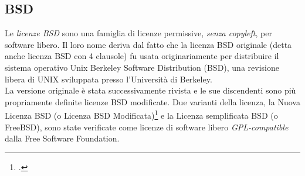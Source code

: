 \subsection{BSD}
Le \textit{licenze BSD} sono una famiglia di licenze permissive, \textit{senza copyleft}, per software libero. Il loro nome deriva dal fatto che la licenza BSD originale (detta anche licenza BSD con 4 clausole) fu usata originariamente per distribuire il sistema operativo Unix Berkeley Software Distribution (BSD), una revisione libera di UNIX sviluppata presso l'Università di Berkeley. \\
La versione originale è stata successivamente rivista e le sue discendenti sono più propriamente definite licenze BSD modificate. Due varianti della licenza, la Nuova Licenza BSD (o Licenza BSD Modificata)\footcite{site:bsd} e la Licenza semplificata BSD (o FreeBSD), sono state verificate come licenze di software libero \textit{GPL-compatible} dalla Free Software Foundation.

